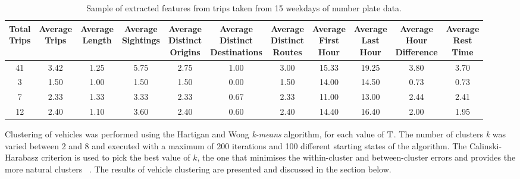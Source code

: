 \begin{table*}[t]
\centering
\begin{tabular}{c c c c c c c c c c c}
  \hline
 \thead{Total\\Trips} & \thead{Average\\Trips} & \thead{Average\\Length} & \thead{Average\\Sightings} & \thead{Average\\Distinct\\Origins} & \thead{Average\\Distinct\\Destinations} & \thead{Average\\Distinct\\Routes} & \thead{Average\\First\\Hour} & \thead{Average\\Last\\Hour} & \thead{Average\\Hour\\Difference} & \thead{Average\\Rest\\Time} \\
  \hline
41 & 3.42 & 1.25 & 5.75 & 2.75 & 1.00 & 3.00 & 15.33 & 19.25 & 3.80 & 3.70 \\
3 & 1.50 & 1.00 & 1.50 & 1.50 & 0.00 & 1.50 & 14.00 & 14.50 & 0.73 & 0.73 \\
7 & 2.33 & 1.33 & 3.33 & 2.33 & 0.67 & 2.33 & 11.00 & 13.00 & 2.44 & 2.41 \\
12 & 2.40 & 1.10 & 3.60 & 2.40 & 0.60 & 2.40 & 14.40 & 16.40 & 2.00 & 1.95 \\
   \hline
\end{tabular}
\caption{Sample of extracted features from trips taken from 15 weekdays of number plate data.}
\label{t:features}
\end{table*}

Clustering of vehicles was performed using the Hartigan and Wong \emph{k-means} algorithm, for each value of $\mathrm{T}$. The number of clusters \emph{k} was varied between 2 and 8 and executed with a maximum of 200 iterations and 100 different starting states of the algorithm. The Calinski-Harabasz criterion is used to pick the best value of $k$, the one that minimises the within-cluster and between-cluster errors and provides the more natural clusters ~\cite{Kmeans}. The results of vehicle clustering are presented and discussed in the section below.

